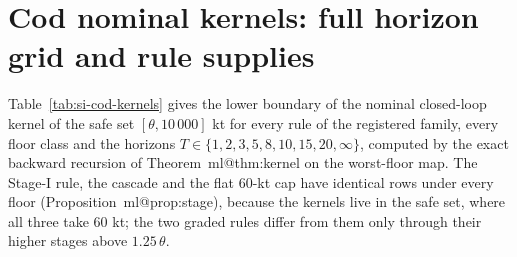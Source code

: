 \documentclass[11pt,a4paper]{article}
\makeatletter
\newcommand{\LRP}{\theta}
\newcommand{\mref}[1]{\csname ml@#1\endcsname}
\makeatother
\begin{document}
\section{Cod nominal kernels: full horizon grid and rule supplies}\label{si:cod-kernels}
Table~\ref{tab:si-cod-kernels} gives the lower boundary of the nominal closed-loop kernel of the safe set $[\LRP,10\,000]$ kt for every rule of the registered family, every floor class and the horizons $T\in\{1,2,3,5,8,10,15,20,\infty\}$, computed by the exact backward recursion of Theorem~\mref{thm:kernel} on the worst-floor map. The Stage-I rule, the cascade and the flat 60-kt cap have identical rows under every floor (Proposition~\mref{prop:stage}), because the kernels live in the safe set, where all three take 60 kt; the two graded rules differ from them only through their higher stages above $1.25\,\LRP$.
\end{document}
